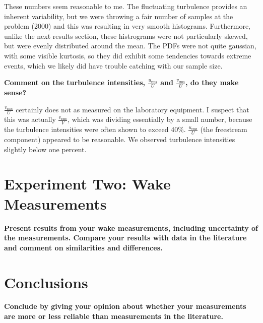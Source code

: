 \documentclass{article}
\begin{document}
These numbers seem reasonable to me. The fluctuating turbulence
provides an inherent variability, but we were throwing a fair number of
samples at the problem (2000) and this was resulting in very smooth
histograms. Furthermore, unlike the next results section, these
histrograms were not particularly skewed, but were evenly distributed
around the mean. The PDFs were not quite gaussian, with some visible
kurtosis, so they did exhibit some tendencies towards extreme events,
which we likely did have trouble catching with our sample size. 


\textbf{Comment on the turbulence intensities,
$\frac{u_{\text{rms}}}{U}$ and $\frac{v_{\text{rms}}}{U}$, do they make sense?}

$\frac{v_{\text{rms}}}{U}$ certainly does not as measured on the
laboratory equipment. I suspect that this was actually
$\frac{v_{\text{rms}}}{V}$, which was dividing essentially by a small number,
because the turbulence intensities were often shown to exceed 40\%. 
$\frac{u_{\text{rms}}}{U}$ (the freestream component) appeared to be
reasonable. We observed turbulence intensities slightly below one
percent. 

\section{Experiment Two: Wake Measurements}

\textbf{Present results from your wake measurements, including
uncertainty of the measurements. Compare your results with data in the
literature and comment on similarities and differences. } 


\section{Conclusions}


\textbf{Conclude by giving your opinion about whether your measurements
are more or less reliable than measurements in the literature.} 

%
%
%
\end{document}
